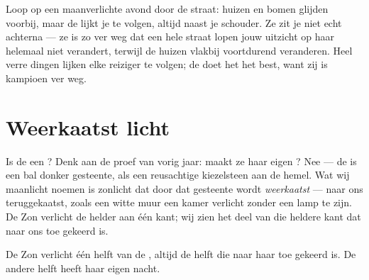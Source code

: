 \begin{example}\label{ex:g2:moon-in-the-sky:follows}
Loop op een maanverlichte avond door de straat: huizen en bomen
glijden voorbij, maar de  lijkt je te volgen, altijd naast je
schouder. Ze zit je niet echt achterna --- ze is zo ver weg dat een
hele straat lopen jouw uitzicht op haar helemaal niet verandert,
terwijl de huizen vlakbij voortdurend veranderen. Heel verre dingen
lijken elke reiziger te volgen; de  doet het het best, want zij is
kampioen ver weg.
\end{example}

\section{Weerkaatst licht}

\begin{example}\label{ex:g2:moon-in-the-sky:borrowed}
Is de  een ? Denk aan de proef van vorig jaar: maakt ze
haar eigen ? Nee --- de  is een bal donker gesteente, als
een reusachtige kiezelsteen aan de hemel. Wat wij maanlicht noemen is
zonlicht dat door dat gesteente wordt \emph{weerkaatst} --- naar ons
teruggekaatst, zoals een witte muur een kamer verlicht zonder een lamp
te zijn. De Zon verlicht de  helder aan één kant; wij zien het deel
van die heldere kant dat naar ons toe gekeerd is.
\end{example}

\begin{omfigure}

{\small De Zon verlicht één helft van de , altijd de helft die
naar haar toe gekeerd is. De andere helft heeft haar eigen nacht.}
\end{omfigure}

